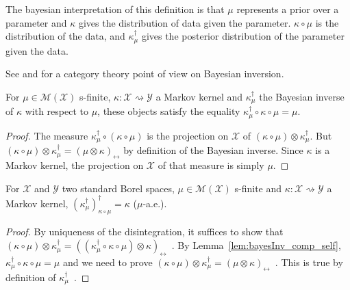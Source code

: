 The bayesian interpretation of this definition is that $\mu$ represents a prior over a parameter and $\kappa$ gives the distribution of data given the parameter. $\kappa \circ \mu$ is the distribution of the data, and $\kappa_\mu^\dagger$ gives the posterior distribution of the parameter given the data.

See \cite{clerc2017pointless} and \cite{dahlqvist2018borel} for a category theory point of view on Bayesian inversion.

\begin{lemma}
  \label{lem:bayesInv_comp_self}
  For $\mu \in \mathcal M(\mathcal X)$ s-finite, $\kappa : \mathcal X \rightsquigarrow \mathcal Y$ a Markov kernel and $\kappa_\mu^\dagger$ the Bayesian inverse of $\kappa$ with respect to $\mu$, these objects satisfy the equality $\kappa_\mu^\dagger \circ \kappa \circ \mu = \mu$.
\end{lemma}

\begin{proof}%
\uses{}
The measure $\kappa_\mu^\dagger \circ (\kappa \circ \mu)$ is the projection on $\mathcal X$ of $(\kappa \circ \mu) \otimes \kappa_\mu^\dagger$. But $(\kappa \circ \mu) \otimes \kappa_\mu^\dagger = (\mu \otimes \kappa)_\leftrightarrow$ by definition of the Bayesian inverse. Since $\kappa$ is a Markov kernel, the projection on $\mathcal X$ of that measure is simply $\mu$.
\end{proof}

\begin{lemma}
  \label{lem:bayesInv_self}
  For $\mathcal X$ and $\mathcal Y$ two standard Borel spaces, $\mu \in \mathcal M(\mathcal X)$ s-finite and $\kappa : \mathcal X \rightsquigarrow \mathcal Y$ a Markov kernel, $(\kappa_\mu^\dagger)_{\kappa \circ \mu}^\dagger = \kappa$ ($\mu$-a.e.).
\end{lemma}

\begin{proof}%
{}
By uniqueness of the disintegration, it suffices to show that $(\kappa \circ \mu) \otimes \kappa_\mu^\dagger = ((\kappa_\mu^\dagger \circ \kappa \circ \mu) \otimes \kappa)_\leftrightarrow$~.
By Lemma~\ref{lem:bayesInv_comp_self}, $\kappa_\mu^\dagger \circ \kappa \circ \mu = \mu$ and we need to prove $(\kappa \circ \mu) \otimes \kappa_\mu^\dagger = (\mu \otimes \kappa)_\leftrightarrow$~.
This is true by definition of $\kappa_\mu^\dagger$~.
\end{proof}


